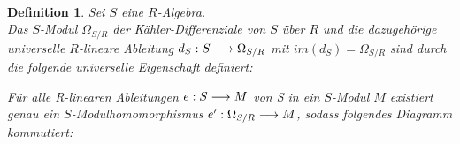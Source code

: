 \documentclass[10pt,a4paper]{report}
\newcounter{Aussage}[chapter]
\newtheorem{definition}[Aussage]{Definition}
\newcommand{\functionfront}[3]{\nolinebreak{#1:#2 \longrightarrow #3}}
\newcommand{\divR}[2]{\Omega_{#1/#2}}
\newcommand{\divf}[1]{d_{#1}}
\newcommand{\immage}[1]{im(#1)}
\begin{document}
\ \\
\begin{definition}
Sei $S$ eine $R$-Algebra.\\
Das $S$-Modul $\divR{S}{R}$ der Kähler-Differenziale von $S$ über $R$ und die dazugehörige universelle $R$-lineare Ableitung $\functionfront{\divf{S}}{S}{\divR{S}{R}}$ mit $\immage{\divf{S}} = \divR{S}{R}$ sind durch die folgende universelle Eigenschaft definiert:

\begin{center}
Für alle R-linearen Ableitungen $\functionfront{e}{S}{M}$ von S in ein $S$-Modul $M$ existiert genau ein $S$-Modulhomomorphismus $\functionfront{e'}{\divR{S}{R}}{M}$, sodass folgendes Diagramm kommutiert:\\
\end{center}
\end{definition}
\end{document}
